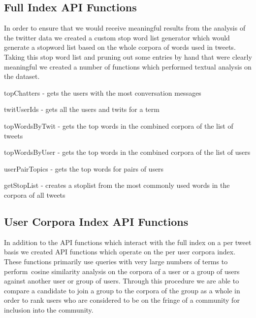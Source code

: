 \subsection{Full Index API Functions}
In order to ensure that we would receive meaningful results from the analysis of the twitter data we created a custom stop word list generator which would generate a stopword list based on the whole corpora of words used in tweets.  Taking this stop word list and pruning out some entries by hand that were clearly meaningful we created a number of functions which performed textual analysis on the dataset.
\begin{list}{.}
{
\setlength{\rightmargin}{\leftmargin}}
\item topChatters - gets the users with the most conversation messages
\item twitUserIds - gets all the users and twits for a term
\item topWordsByTwit - gets the top words in the combined corpora of the list of tweets
\item topWordsByUser - gets the top words in the combined corpora of the list of users
\item userPairTopics - gets the top words for pairs of users
\item getStopList - creates a stoplist from the most commonly used words in the corpora of all tweets
\subsection{User Corpora Index API Functions}
In addition to the API functions which interact with the full index on a per tweet basis we created API functions which operate on the per user corpora index.  These functions primarily use queries with very large numbers of terms to perform cosine similarity analysis on the corpora of a user or a group of users against another user or group of users.  Through this procedure we are able to compare a candidate to join a group to the corpora of the group as a whole in order to rank users who are considered to be on the fringe of a community for inclusion into the community.
\end{list}
